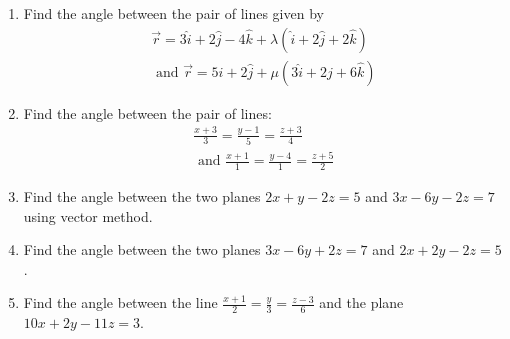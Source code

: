 \begin{enumerate}[label=\thesubsection.\arabic*, ref=\thesubsection.\theenumi]
\begin{enumerate}
\end{enumerate}
\item Find the angle between the pair of lines given by
\begin{align}
\overrightarrow{r}= 3 \hat{i}+ 2 \hat{j}- 4 \hat{k}+ \lambda(\hat{i}+ 2 \hat{j}+ 2 \hat{k}) \\
\text{ and } \overrightarrow{r}= 5 \hat{i}+ 2 \hat{j}+ \mu(3 \hat{i}+ 2 \hat{j}+ 6 \hat{k}) 
\end{align}
\item Find the angle between the pair of lines:
\begin{align}
\frac{x+3}{3}= \frac{y-1}{5}= \frac{z+3}{4}\\
\text{ and }\frac{x+1}{1}= \frac{y-4}{1}= \frac{z+5}{2}
\end{align}
\item Find the angle between the two planes $2x +y -2z =5$ and $3x- 6y- 2z= 7$ using vector method.
\item Find the angle between the two planes $3x -6y +2z =7$ and $2x +2y -2z =5$.
\item Find the angle between the line $\frac{x+1}{2} =\frac{y}{3} =\frac{z-3}{6}$ and the plane $10x +2y -11z =3$.
\end{enumerate}
